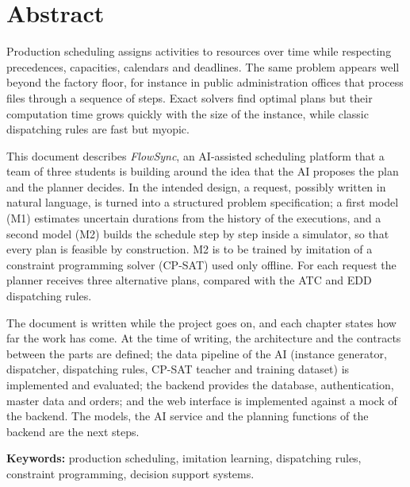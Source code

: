 \chapter*{Abstract}

Production scheduling assigns activities to resources over time while respecting precedences,
capacities, calendars and deadlines. The same problem appears well beyond the factory floor, for
instance in public administration offices that process files through a sequence of steps.
Exact solvers find optimal plans but their computation time grows quickly with the size of the
instance, while classic dispatching rules are fast but myopic.

This document describes \emph{FlowSync}, an AI-assisted scheduling platform that a team of three
students is building around the idea that the AI proposes the plan and the planner decides. In
the intended design, a request, possibly written in natural language, is turned into a
structured problem specification; a first model (M1) estimates uncertain durations from the
history of the executions, and a second model (M2) builds the schedule step by step inside a
simulator, so that every plan is feasible by construction. M2 is to be trained by imitation of a
constraint programming solver (CP-SAT) used only offline. For each request the planner receives
three alternative plans, compared with the ATC and EDD dispatching rules.

The document is written while the project goes on, and each chapter states how far the work has
come. At the time of writing, the architecture and the contracts between the parts are defined;
the data pipeline of the AI (instance generator, dispatcher, dispatching rules, CP-SAT teacher
and training dataset) is implemented and evaluated; the backend provides the database,
authentication, master data and orders; and the web interface is implemented against a mock of
the backend. The models, the AI service and the planning functions of the backend are the next
steps.

\vspace{0.5cm}
\noindent\textbf{Keywords:} production scheduling, imitation learning, dispatching rules,
constraint programming, decision support systems.
